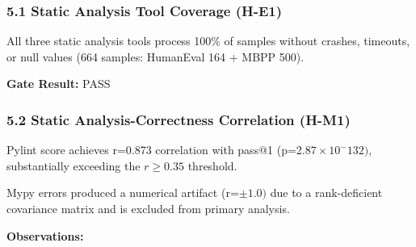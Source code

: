 
\subsubsection{5.1 Static Analysis Tool Coverage (H-E1)}

All three static analysis tools process 100\% of samples without crashes, timeouts, or null values (664 samples: HumanEval 164 + MBPP 500).

\begin{table}[htbp]
\centering
{}
\end{table}

\textbf{Gate Result:} PASS

\subsubsection{5.2 Static Analysis-Correctness Correlation (H-M1)}

Pylint score achieves r=0.873 correlation with pass@1 (p=2.$87\times 10^-132)$, substantially exceeding the $r\geq 0.35$ threshold.

\begin{table}[htbp]
\centering
{}
\end{table}

Mypy errors produced a numerical artifact (r=$\pm 1.0)$ due to a rank-deficient covariance matrix and is excluded from primary analysis.

\textbf{Observations:}


